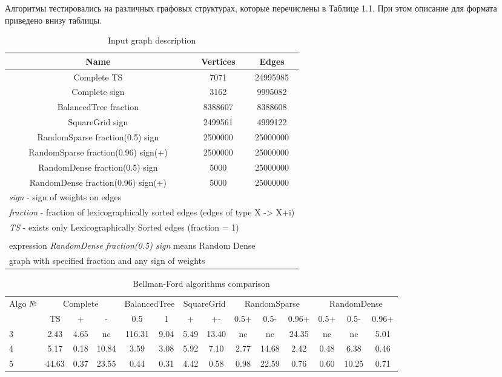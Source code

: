 Алгоритмы тестировались на различных графовых структурах, которые перечислены в Таблице 1.1. При этом описание для формата приведено внизу таблицы.
\begin{table}
\centering

\begin{tabular}{c|c|c}  
Name & Vertices & Edges\\
\hline\hline
Complete TS & 7071 & 24995985 \\  
Complete sign & 3162 & 9995082  \\  
BalancedTree fraction & 8388607 & 8388608 \\  
SquareGrid sign & 2499561 & 4999122  \\  
RandomSparse fraction(0.5) sign & 2500000 & 25000000  \\  
RandomSparse fraction(0.96) sign(+) & 2500000 & 25000000  \\  
RandomDense fraction(0.5) sign & 5000 & 25000000  \\  
RandomDense fraction(0.96) sign(+) & 5000 & 25000000  \\  
\hline
\multicolumn{3}{l}{\footnotesize \textit{sign} - sign of weights on edges }\\
\multicolumn{3}{l}{\footnotesize \textit{fraction} - fraction of lexicographically sorted edges (edges of type X -> X+i) }\\
\multicolumn{3}{l}{\footnotesize \textit{TS} - exists only Lexicographically Sorted edges (fraction = 1) }\\
\multicolumn{3}{l}{\footnotesize }\\
\multicolumn{3}{l}{\footnotesize  expression \textit{RandomDense fraction(0.5) sign} means Random Dense }\\
\multicolumn{3}{l}{\footnotesize 	graph with specified fraction and any sign of weights}\\
\end{tabular}

\caption{Input graph description}
\label{bf_algo_comparison}
\end{table}

\begin{table}
\centering

\begin{tabular}{l|ccc|cc|cc|ccc|ccc}  
Algo №& \multicolumn{3}{c}{Complete} & \multicolumn{2}{c}{BalancedTree} & \multicolumn{2}{c}{SquareGrid} & \multicolumn{3}{c}{RandomSparse} & \multicolumn{3}{c}{RandomDense}\\
& TS & + & - & 0.5 & 1 & + & +- & 0.5+  & 0.5- & 0.96+ & 0.5+ & 0.5- & 0.96+\\
\hline\hline
3 & 2.43 & 4.65 & nc & 116.31 & 9.04 & 5.49 & 13.40 & nc & nc & 24.35 & nc & nc & 5.01 \\  
4 & 5.17 & 0.18 & 10.84 & 3.59 & 3.08 & 5.92 & 7.10 & 2.77 & 14.68 & 2.42 & 0.48  & 6.38  & 0.46 \\
5 & 44.63 & 0.37 & 23.55 & 0.44 & 0.31 & 4.42 & 0.58 & 0.98 & 22.59 & 0.76  & 0.60  & 10.25 & 0.71 \\
\hline
\end{tabular}

\caption{Bellman-Ford algorithms comparison}
\label{graph_description}
\end{table}

